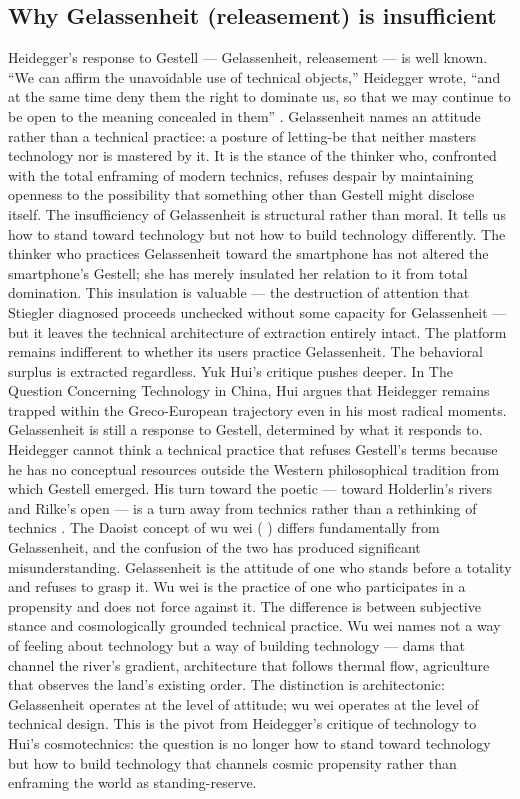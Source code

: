 \subsection{Why Gelassenheit (releasement) is insufficient}

Heidegger’s response to Gestell — Gelassenheit, releasement — is well known. “We can affirm the unavoidable use of technical objects,” Heidegger wrote, “and at the same time deny them the right to dominate us, so that we may continue to be open to the meaning concealed in them” \cite[p.~54]{heidegger_1966}. Gelassenheit names an attitude rather than a technical practice: a posture of letting-be that neither masters technology nor is mastered by it. It is the stance of the thinker who, confronted with the total enframing of modern technics, refuses despair by maintaining openness to the possibility that something other than Gestell might disclose itself. The insufficiency of Gelassenheit is structural rather than moral. It tells us how to stand toward technology but not how to build technology differently. The thinker who practices Gelassenheit toward the smartphone has not altered the smartphone’s Gestell; she has merely insulated her relation to it from total domination. This insulation is valuable — the destruction of attention that Stiegler diagnosed proceeds unchecked without some capacity for Gelassenheit — but it leaves the technical architecture of extraction entirely intact. The platform remains indifferent to whether its users practice Gelassenheit. The behavioral surplus is extracted regardless. Yuk Hui’s critique pushes deeper. In The Question Concerning Technology in China, Hui argues that Heidegger remains trapped within the Greco-European trajectory even in his most radical moments. Gelassenheit is still a response to Gestell, determined by what it responds to. Heidegger cannot think a technical practice that refuses Gestell’s terms because he has no conceptual resources outside the Western philosophical tradition from which Gestell emerged. His turn toward the poetic — toward Holderlin’s rivers and Rilke’s open — is a turn away from technics rather than a rethinking of technics \cite[pp.~85--112]{hui_2017}. The Daoist concept of wu wei (   ) differs fundamentally from Gelassenheit, and the confusion of the two has produced significant misunderstanding. Gelassenheit is the attitude of one who stands before a totality and refuses to grasp it. Wu wei is the practice of one who participates in a propensity and does not force against it. The difference is between subjective stance and cosmologically grounded technical practice. Wu wei names not a way of feeling about technology but a way of building technology — dams that channel the river’s gradient, architecture that follows thermal flow, agriculture that observes the land’s existing order. The distinction is architectonic: Gelassenheit operates at the level of attitude; wu wei operates at the level of technical design. This is the pivot from Heidegger’s critique of technology to Hui’s cosmotechnics: the question is no longer how to stand toward technology but how to build technology that channels cosmic propensity rather than enframing the world as standing-reserve.

